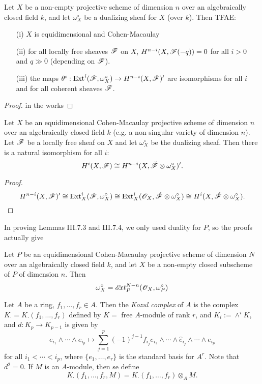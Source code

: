   \begin{theorem}
  Let $X$ be a non-empty projective scheme of dimension $n$ over
  an algebraically closed field $k$, and let $\omega_X^{\circ}$ be
  a dualizing sheaf for $X$ (over $k$).  Then TFAE:
  \begin{itemize}
   \item[(i)] $X$ is equidimensional and Cohen-Macaulay
   \item[(ii)] for all locally free sheaves $\mathscr{F}$ on $X$,
   $H^{n-i}(X,\mathscr{F}(-q))=0$ for all $i>0$ and $q\gg 0$ (depending on
   $\mathscr{F}$).
   \item[(iii)] the maps $\theta^i:\text{\rm Ext}^i(\mathscr{F},\omega_X^{\circ})\to
   H^{n-i}(X,\mathscr{F})'$ are isomorphisms for all $i$ and for all
   coherent sheaves $\mathscr{F}$.
  \end{itemize}
 \end{theorem}
 \begin{proof}
 in the works
 \end{proof}

 \begin{corollary}
 Let $X$ be an equidimensional Cohen-Macaulay projective scheme of
 dimension $n$ over an algebraically closed field $k$ (e.g. a
 non-singular variety of dimension $n$).  Let $\mathscr{F}$ be a locally
 free sheaf on $X$ and let $\omega_X^{\circ}$ be the dualizing
 sheaf.  Then there is a natural isomorphism for all $i$:
 \[
    H^i(X,\mathscr{F}) \cong H^{n-i}(X,\check {\mathscr{F}} \otimes
    \omega_X^{\circ})'.
 \]
 \end{corollary}
 \begin{proof}
 \[
    H^{n-i}(X,\mathscr{F})' \cong \text{\rm Ext}_X^i(\mathscr{F},\omega_X^{\circ}) \cong
    \text{\rm Ext}_X^i(\mathscr{O}_X,\check {\mathscr{F}}\otimes \omega_X^{\circ}) \cong
    H^i(X,\check {\mathscr{F}}\otimes \omega_X^{\circ}).
 \]
 \end{proof}

 \begin{remark}
 In proving Lemmas III.7.3 and III.7.4, we only used duality for
 $P$, so the proofs actually give
 \begin{theorem} Let $P$ be an equidimensional Cohen-Macaulay
 projective scheme of dimension $N$ over an algebraically closed
 field $k$, and let $X$ be a non-empty closed subscheme of $P$ of
 dimension $n$.  Then
 \[
    \omega_X^{\circ} = \mathscr{E}\!xt^{N-n}_P(\mathscr{O}_X,\omega_P^{\circ})
 \]
 \end{theorem}
 \end{remark}

 \begin{definition} Let $A$ be a ring, $f_1,\dots, f_r\in A$.
 Then the \emph{Kozul complex} of $A$ is the complex $K_{\cdot} =
 K_{\cdot}(f_1,\dots,f_r)$ defined by $K=$ free $A$-module of rank
 $r$, and $K_i:=\wedge^i K$, and $d:K_p\to K_{p-1}$ is given by
 \[
    e_{i_1}\wedge \cdots \wedge e_{i_p} \mapsto \sum_{j=1}^p
    (-1)^{j-1} f_{i_j} e_{i_1}\wedge\cdots \wedge \hat e_{i_j}
    \wedge \cdots \wedge e_{i_p}
 \]
 for all $i_1<\cdots < i_p$, where $\{e_1,\dots, e_r\}$ is the
 standard basis for $A^r$.  Note that $d^2=0$.  If $M$ is an
 $A$-module, then se define
 \[
    K_{\cdot}(f_1,\dots, f_r, M) = K_{\cdot}(f_1,\dots,
    f_r)\otimes_A M.
 \]
 \end{definition}
